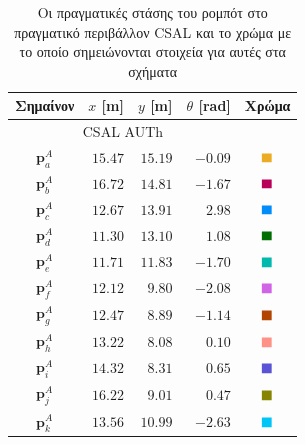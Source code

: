 \begin{table}\centering
  \begin{tabular} {c|rrrc}                                                 \toprule
    Σημαίνον       & $x$ [m]   & $y$  [m]  & $\theta$ [rad]  & Χρώμα    \\ \toprule
    \multicolumn{4}{c}{CSAL AUTh}                                       \\ \midrule
    $\bm{p}_a^A$   & $15.47$   & $15.19$   & $-0.09$         & $\squarea$ \\
    $\bm{p}_b^A$   & $16.72$   & $14.81$   & $-1.67$         & $\squareb$ \\
    $\bm{p}_c^A$   & $12.67$   & $13.91$   & $2.98$          & $\squarec$ \\
    $\bm{p}_d^A$   & $11.30$   & $13.10$   & $1.08$          & $\squared$ \\
    $\bm{p}_e^A$   & $11.71$   & $11.83$   & $-1.70$         & $\squaree$ \\
    $\bm{p}_f^A$   & $12.12$   & $9.80$    & $-2.08$         & $\squaref$ \\
    $\bm{p}_g^A$   & $12.47$   & $8.89$    & $-1.14$         & $\squareg$ \\
    $\bm{p}_h^A$   & $13.22$   & $8.08$    & $0.10$          & $\squareh$ \\
    $\bm{p}_i^A$   & $14.32$   & $8.31$    & $0.65$          & $\squarei$ \\
    $\bm{p}_j^A$   & $16.22$   & $9.01$    & $0.47$          & $\squarej$ \\
    $\bm{p}_k^A$   & $13.56$   & $10.99$   & $-2.63$         & $\squarek$ \\ \bottomrule
  \end{tabular}
  \caption{\small Οι πραγματικές στάσης του ρομπότ στο πραγματικό περιβάλλον
           CSAL και το χρώμα με το οποίο σημειώνονται στοιχεία για αυτές στα
           σχήματα}
  \label{tbl:02_03_04:true_poses_experiment}
\end{table}

